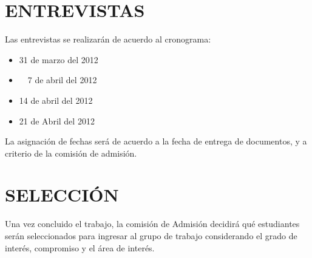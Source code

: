 \documentclass[11pt,letterpaper]{report}
\begin{document}
\section*{\bf \normalsize ENTREVISTAS}
Las entrevistas se realizarán de acuerdo al cronograma:
\begin{itemize}
\item 31 de marzo del 2012
\item ~~7 de abril del 2012
\item 14 de abril del 2012
\item 21 de Abril del 2012
\end{itemize}
La asignación de fechas será de acuerdo a la fecha de entrega de documentos, y a criterio de la comisión de admisión.
\section*{\bf \normalsize SELECCIÓN}
Una vez concluido el trabajo, la comisión de Admisión decidirá qué estudiantes serán seleccionados para ingresar al grupo de trabajo considerando el grado de interés, compromiso y el área  de interés.
\end{document}

